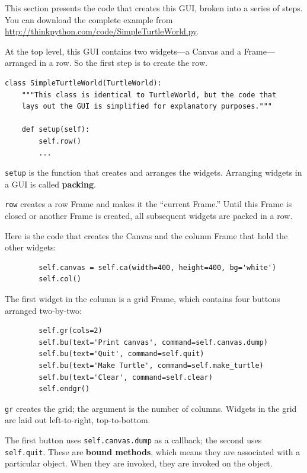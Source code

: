\documentclass[10pt]{book}
\begin{document}
This section presents the code that creates this GUI, broken into a
series of steps.  You can download the complete example
from \url{http://thinkpython.com/code/SimpleTurtleWorld.py}.

At the top level, this GUI contains two widgets---a Canvas and a
Frame---arranged in a row.  So the first step is to create the row.

\begin{verbatim}
class SimpleTurtleWorld(TurtleWorld):
    """This class is identical to TurtleWorld, but the code that
    lays out the GUI is simplified for explanatory purposes."""

    def setup(self):
        self.row()
        ...
\end{verbatim}
%
{\tt setup} is the function that creates and arranges the widgets.
Arranging widgets in a GUI is called {\bf packing}.

{\tt row} creates a row Frame and makes it the ``current Frame.''
Until this Frame is closed or another Frame is created, all
subsequent widgets are packed in a row.

Here is the code that creates the Canvas and the column Frame
that hold the other widgets:

\begin{verbatim}
        self.canvas = self.ca(width=400, height=400, bg='white')
        self.col()
\end{verbatim}
%
The first widget in the column is a grid Frame, which contains
four buttons arranged two-by-two:

\begin{verbatim}
        self.gr(cols=2)
        self.bu(text='Print canvas', command=self.canvas.dump)
        self.bu(text='Quit', command=self.quit)
        self.bu(text='Make Turtle', command=self.make_turtle)
        self.bu(text='Clear', command=self.clear)
        self.endgr()
\end{verbatim}
%
{\tt gr} creates the grid; the argument is the number of
columns.  Widgets in the grid are
laid out left-to-right, top-to-bottom.

The first button uses {\tt self.canvas.dump} as a callback; the second
uses {\tt self.quit}.  These are {\bf bound methods}, which means they
are associated with a particular object.  When they are invoked, they
are invoked on the object.
\end{document}

